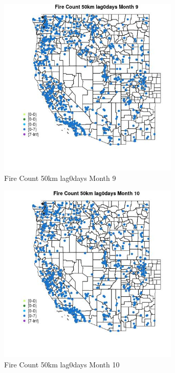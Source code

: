 \begin{figure} 
\centering  
\includegraphics[width=0.77\textwidth]{Code_Outputs/Report_ML_input_PM25_Step4_part_e_de_duplicated_aves_compiled_2019-05-21wNAs_MapObsMo9Fire_Count_50km_lag0days.jpg} 
\caption{\label{fig:Report_ML_input_PM25_Step4_part_e_de_duplicated_aves_compiled_2019-05-21wNAsMapObsMo9Fire_Count_50km_lag0days}Fire Count 50km lag0days Month 9} 
\end{figure} 
 

\begin{figure} 
\centering  
\includegraphics[width=0.77\textwidth]{Code_Outputs/Report_ML_input_PM25_Step4_part_e_de_duplicated_aves_compiled_2019-05-21wNAs_MapObsMo10Fire_Count_50km_lag0days.jpg} 
\caption{\label{fig:Report_ML_input_PM25_Step4_part_e_de_duplicated_aves_compiled_2019-05-21wNAsMapObsMo10Fire_Count_50km_lag0days}Fire Count 50km lag0days Month 10} 
\end{figure} 
 


